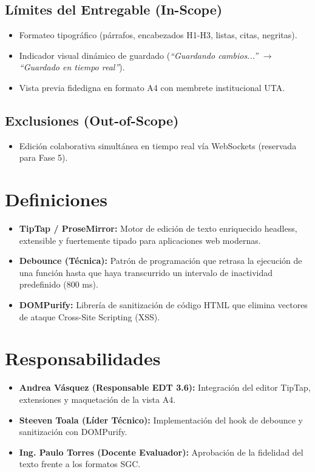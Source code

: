 \documentclass[12pt,a4paper]{article}
\begin{document}
\subsection{Límites del Entregable (In-Scope)}
\begin{itemize}[leftmargin=1.5em, itemsep=2pt]
    \item Formateo tipográfico (párrafos, encabezados H1-H3, listas, citas, negritas).
    \item Indicador visual dinámico de guardado (\textit{``Guardando cambios...''} $\to$ \textit{``Guardado en tiempo real''}).
    \item Vista previa fidedigna en formato A4 con membrete institucional UTA.
\end{itemize}
\subsection{Exclusiones (Out-of-Scope)}
\begin{itemize}[leftmargin=1.5em, itemsep=2pt]
    \item Edición colaborativa simultánea en tiempo real vía WebSockets (reservada para Fase 5).
\end{itemize}

\section{Definiciones}
\begin{itemize}[leftmargin=1.5em, itemsep=2pt]
    \item \textbf{TipTap / ProseMirror:} Motor de edición de texto enriquecido headless, extensible y fuertemente tipado para aplicaciones web modernas.
    \item \textbf{Debounce (Técnica):} Patrón de programación que retrasa la ejecución de una función hasta que haya transcurrido un intervalo de inactividad predefinido (800 ms).
    \item \textbf{DOMPurify:} Librería de sanitización de código HTML que elimina vectores de ataque Cross-Site Scripting (XSS).
\end{itemize}

\section{Responsabilidades}
\begin{itemize}[leftmargin=1.5em, itemsep=2pt]
    \item \textbf{Andrea Vásquez (Responsable EDT 3.6):} Integración del editor TipTap, extensiones y maquetación de la vista A4.
    \item \textbf{Steeven Toala (Líder Técnico):} Implementación del hook de debounce y sanitización con DOMPurify.
    \item \textbf{Ing. Paulo Torres (Docente Evaluador):} Aprobación de la fidelidad del texto frente a los formatos SGC.
\end{itemize}
\end{document}
